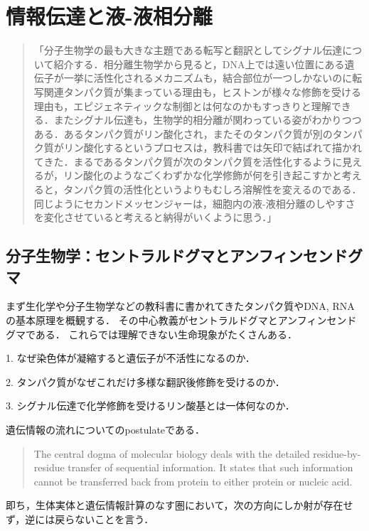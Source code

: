 \documentclass[uplatex, dvipdfmx]{jsreport}
\begin{document}
\chapter{情報伝達と液-液相分離}
\begin{quote}
    「分子生物学の最も大きな主題である転写と翻訳としてシグナル伝達について紹介する．相分離生物学から見ると，DNA上では遠い位置にある遺伝子が一挙に活性化されるメカニズムも，結合部位が一つしかないのに転写関連タンパク質が集まっている理由も，ヒストンが様々な修飾を受ける理由も，エピジェネティックな制御とは何なのかもすっきりと理解できる．またシグナル伝達も，生物学的相分離が関わっている姿がわかりつつある．あるタンパク質がリン酸化され，またそのタンパク質が別のタンパク質がリン酸化するというプロセスは，教科書では矢印で結ばれて描かれてきた．まるであるタンパク質が次のタンパク質を活性化するように見えるが，リン酸化のようなごくわずかな化学修飾が何を引き起こすかと考えると，タンパク質の活性化というよりもむしろ溶解性を変えるのである．同じようにセカンドメッセンジャーは，細胞内の液-液相分離のしやすさを変化させていると考えると納得がいくように思う．」\cite{白木賢太郎}
\end{quote}

\section{分子生物学：セントラルドグマとアンフィンセンドグマ}
まず生化学や分子生物学などの教科書に書かれてきたタンパク質やDNA, RNAの基本原理を概観する．
その中心教義がセントラルドグマとアンフィンセンドグマである．
これらでは理解できない生命現象がたくさんある．
\begin{screen}
    1. なぜ染色体が凝縮すると遺伝子が不活性になるのか．

    2. タンパク質がなぜこれだけ多様な翻訳後修飾を受けるのか．

    3. シグナル伝達で化学修飾を受けるリン酸基とは一体何なのか．
\end{screen}

\begin{definition}
    遺伝情報の流れについてのpostulateである．
    \begin{quote}
        The central dogma of molecular biology deals with the detailed residue-by-residue transfer of sequential information. It states that such information cannot be transferred back from protein to either protein or nucleic acid.\cite{Crick central dogma}
    \end{quote}
    即ち，生体実体と遺伝情報計算のなす圏において，次の方向にしか射が存在せず，逆には戻らないことを言う．
    \begin{center}
    \end{center}
\end{definition}
\end{document}
